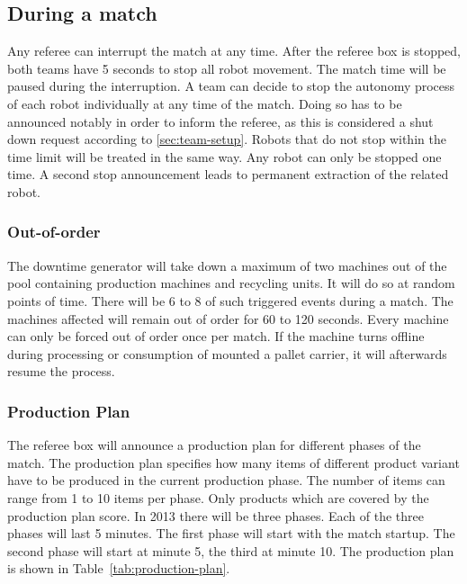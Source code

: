 \documentclass[12pt,twoside]{article}
\begin{document}
\subsection{During a match}

Any referee can interrupt the match at any time. After the referee box
is stopped, both teams have 5 seconds to stop all robot movement. The
match time will be paused during the interruption. A team can decide to
stop the autonomy process of each robot individually at any time of the
match. Doing so has to be announced notably in order to inform the
referee, as this is considered a shut down request according to
\ref{sec:team-setup}. Robots that do not stop within the time limit
will be treated in the same way. Any robot can only be stopped one
time. A second stop announcement leads to permanent extraction of the
related robot.

\subsubsection{Out-of-order}

The downtime generator will take down a maximum of two machines out of
the pool containing production machines and recycling units. It will
do so at random points of time. There will be 6 to 8 of such triggered
events during a match. The machines affected will remain out of order
for 60 to 120 seconds. Every machine can only be forced out of order
once per match. If the machine turns offline during processing or
consumption of mounted a pallet carrier, it will afterwards resume the
process.

\subsubsection{Production Plan}

The referee box will announce a production plan for different
phases of the match. The production plan specifies how many items of
different product variant have to be produced in the current production phase.
The number of items can range from 1 to 10 items per phase. Only products which
are covered by the production plan score. In 2013 there will be three phases.
Each of the three phases will last 5 minutes. The first phase will start with
the match startup. The second phase will start at minute 5, the third at minute
10. The production plan is shown in Table~\ref{tab:production-plan}.
\end{document}
